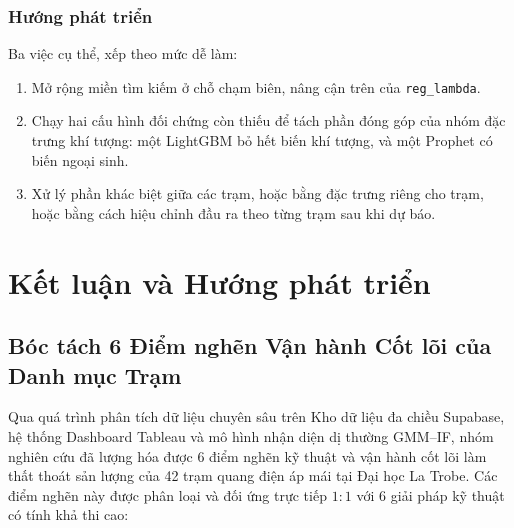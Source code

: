 \documentclass[12pt, a4paper]{report}
\begin{document}
\FloatBarrier
\subsection{Hướng phát triển}
\label{subsec:huong_phat_trien}

Ba việc cụ thể, xếp theo mức dễ làm:

\begin{enumerate}
    \item Mở rộng miền tìm kiếm ở chỗ chạm biên, nâng cận trên của \texttt{reg\_lambda}.
    \item Chạy hai cấu hình đối chứng còn thiếu để tách phần đóng góp của nhóm đặc trưng khí
    tượng: một LightGBM bỏ hết biến khí tượng, và một Prophet có biến ngoại sinh.
    \item Xử lý phần khác biệt giữa các trạm, hoặc bằng đặc trưng riêng cho trạm, hoặc bằng
    cách hiệu chỉnh đầu ra theo từng trạm sau khi dự báo.
\end{enumerate}


\setcounter{topnumber}{2}
\setcounter{bottomnumber}{1}
\setcounter{totalnumber}{3}
\renewcommand{\topfraction}{0.7}
\renewcommand{\bottomfraction}{0.3}
\renewcommand{\textfraction}{0.2}
\renewcommand{\floatpagefraction}{0.5}

\newpage

\chapter{Kết luận và Hướng phát triển}
\label{chap:conclusion}

\section{Bóc tách 6 Điểm nghẽn Vận hành Cốt lõi của Danh mục Trạm}
\label{sec:bottlenecks}

Qua quá trình phân tích dữ liệu chuyên sâu trên Kho dữ liệu đa chiều Supabase, hệ thống Dashboard Tableau và mô hình nhận diện dị thường GMM--IF, nhóm nghiên cứu đã lượng hóa được 6 điểm nghẽn kỹ thuật và vận hành cốt lõi làm thất thoát sản lượng của 42 trạm quang điện áp mái tại Đại học La Trobe. Các điểm nghẽn này được phân loại và đối ứng trực tiếp $1:1$ với 6 giải pháp kỹ thuật có tính khả thi cao:
\end{document}
